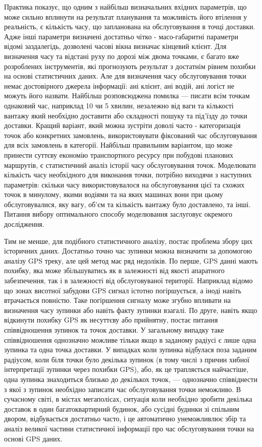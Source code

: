 Практика показує, що одним з найбільш визначальних вхідних параметрів, що може сильно вплинути на результат планування та можливість його втілення у реальність, є кількість часу, що запланована на обслуговування в точці доставки. Адже інші параметри визначені достатньо чітко - масо-габаритні параметри відомі заздалегідь, дозволені часові вікна визначає кінцевий клієнт. Для визначення часу та відстані руху по дорозі між двома точками, є багато вже розроблених інструментів, які прогнозують результат з достатнім рівнем похибки на основі статистичних даних. Але для визначення часу обслуговування точки немає достовірного джерела інформації: ані клієнт, ані водій, ані логіст не можуть його назвати. Найбільш розповсюджена помилка — писати всім точкам однаковий час, наприклад 10 чи 5 хвилин, незалежно від ваги та кількості вантажу який необхідно доставити або складності пошуку та під’їзду до точки доставки. Кращий варіант, який можна зустріти доволі часто - категоризація точок або конкретних замовлень, використовувати фіксований час обслуговування для всіх замовлень в категорії. Найбільш правильним варіантом, що може принести суттєву економію транспортного ресурсу при побудові планових маршрутів, є статистичний аналіз історії часу обслуговування точок. Моделювати кількість часу необхідного для виконання точки, потрібно виходячи з наступних параметрів: скільки часу використовувалося на обслуговування цієї та схожих точок в минулому, якими водіями та на яких машинах вони при цьому обслуговувалися, яку вагу, об’єм та кількість вантажу було доставлено, та інші. Питання вибору оптимального способу моделювання заслуговує окремого дослідження.

Тим не менше, для подібного статистичного аналізу, постає проблема збору цих історичних даних. Достатньо точно час зупинки можна визначити за допомогою аналізу GPS треку, але цей метод має ряд недоліків. По перше, GPS данні мають похибку, яка може збільшуватись як в залежності від якості апаратного забезпечення, так і в залежності від обслуговуваної території. Наприклад відомо що зонах висотної забудови GPS сигнал істотно погіршується, а іноді навіть втрачається повністю. Таке погіршення сигналу може згубно впливати на визначення часу зупинки або навіть факту зупинки взагалі. По друге, навіть якщо відкинути похибку GPS як несуттєву або прийнятну, постає питання співвідношення зупинок та точок доставки. У загальному випадку таке співвідношення однозначно можливе тільки якщо в заданому радіусі є лише одна зупинка та одна точка доставки. У випадках коли зупинка відбулася поза заданим радіусом, коли біля точки було декілька зупинок (в тому числі з причин хибної інтерпретації зупинки через похибки GPS), або, як це трапляється найчастіше, одна зупинка знаходиться близько до декількох точок, — однозначно співвіднести з якої з зупинок необхідно записати час обслуговування точки неможливо. В сучасному світі, в містах мегаполісах, ситуація коли необхідно зробити декілька доставок в один багатоквартирний будинок, або сусідні будинки зі спільним двором, відбувається достатньо часто, і це автоматично унеможливлює збір та аналіз великої частини статистичної інформації про час обслуговування точки на основі GPS даних.

